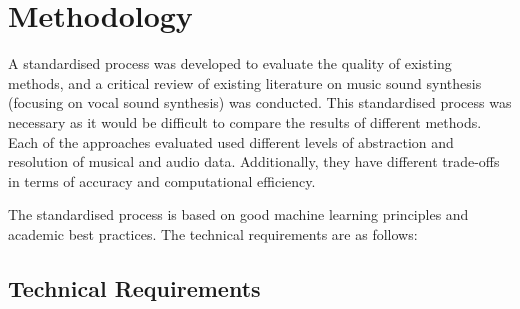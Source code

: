 \section{Methodology}

A standardised process was developed to evaluate the quality of existing methods, and a critical review of existing literature on music sound synthesis (focusing on vocal sound synthesis) was conducted. This standardised process was necessary as it would be difficult to compare the results of different methods. Each of the approaches evaluated used different levels of abstraction and resolution of musical and audio data. Additionally, they have different trade-offs in terms of accuracy and computational efficiency.

The standardised process is based on good machine learning principles and academic best practices. The technical requirements are as follows:

\subsection{Technical Requirements}

